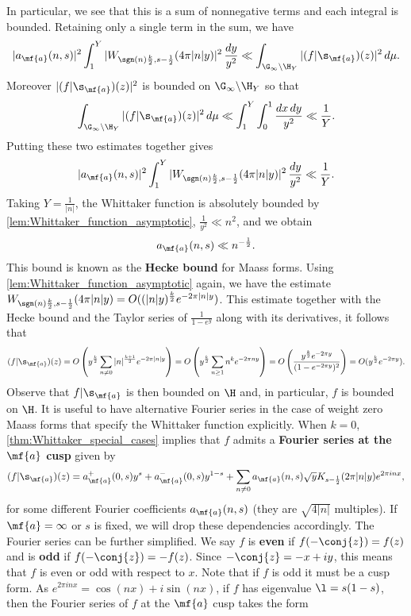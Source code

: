     In particular, we see that this is a sum of nonnegative terms and each integral is bounded. Retaining only a single term in the sum, we have
    \[
      |a_{\mf{a}}(n,s)|^{2}\int_{1}^{Y}|W_{\sgn(n)\frac{k}{2},s-\frac{1}{2}}(4\pi|n|y)|^{2}\,\frac{dy}{y^{2}} \ll \int_{\G_{\infty}\backslash\H_{Y}}|(f|\s_{\mf{a}})(z)|^{2}\,d\mu.
    \]
    Moreover $|(f|\s_{\mf{a}})(z)|^{2}$ is bounded on $\G_{\infty}\backslash\H_{Y}$ so that
    \[
      \int_{\G_{\infty}\backslash\H_{Y}}|(f|\s_{\mf{a}})(z)|^{2}\,d\mu \ll \int_{1}^{Y}\int_{0}^{1}\frac{dx\,dy}{y^{2}} \ll \frac{1}{Y}.
    \]
    Putting these two estimates together gives
    \[
      |a_{\mf{a}}(n,s)|^{2}\int_{1}^{Y}|W_{\sgn(n)\frac{k}{2},s-\frac{1}{2}}(4\pi|n|y)|^{2}\,\frac{dy}{y^{2}} \ll \frac{1}{Y}.
    \]
    Taking $Y = \frac{1}{|n|}$, the Whittaker function is absolutely bounded by \cref{lem:Whittaker_function_asymptotic}, $\frac{1}{y^{2}} \ll n^{2}$, and we obtain
    \[
      a_{\mf{a}}(n,s) \ll n^{-\frac{1}{2}}.
    \]
    This bound is known as the \textbf{Hecke bound} for Maass forms. Using \cref{lem:Whittaker_function_asymptotic} again, we have the estimate $W_{\sgn(n)\frac{k}{2},s-\frac{1}{2}}(4\pi|n|y) = O((|n|y)^{\frac{k}{2}}e^{-2\pi|n|y})$. This estimate together with the Hecke bound and the Taylor series of $\frac{1}{1-e^{y}}$ along with its derivatives, it follows that
    \[
      (f|\s_{\mf{a}})(z) = O\left(y^{\frac{k}{2}}\sum_{n \neq 0}|n|^{\frac{k+1}{2}}e^{-2\pi|n|y}\right) = O\left(y^{\frac{k}{2}}\sum_{n \ge 1}n^{k}e^{-2\pi ny}\right) = O\left(\frac{y^{\frac{k}{2}}e^{-2\pi y}}{(1-e^{-2\pi y})^{2}}\right) = O(y^{\frac{k}{2}}e^{-2\pi y}).
    \]
    Observe that $f|\s_{\mf{a}}$ is then bounded on $\H$ and, in particular, $f$ is bounded on $\H$. It is useful to have alternative Fourier series in the case of weight zero Maass forms that specify the Whittaker function explicitly. When $k = 0$, \cref{thm:Whittaker_special_cases} implies that $f$ admits a \textbf{Fourier series at the $\mf{a}$ cusp} given by
    \[
      (f|\s_{\mf{a}})(z) = a_{\mf{a}}^{+}(0,s)y^{s}+a_{\mf{a}}^{-}(0,s)y^{1-s}+\sum_{n \neq 0}a_{\mf{a}}(n,s)\sqrt{y}K_{s-\frac{1}{2}}(2\pi|n|y)e^{2\pi inx},
    \]
    for some different Fourier coefficients $a_{\mf{a}}(n,s)$ (they are $\sqrt{4|n|}$ multiples). If $\mf{a} = \infty$ or $s$ is fixed, we will drop these dependencies accordingly. The Fourier series can be further simplified. We say $f$ is \textbf{even} if $f(-\conj{z}) = f(z)$ and is \textbf{odd} if $f(-\conj{z}) = -f(z)$. Since $-\conj{z} = -x+iy$, this means that $f$ is even or odd with respect to $x$. Note that if $f$ is odd it must be a cusp form. As $e^{2\pi inx} = \cos(nx)+i\sin(nx)$, if $f$ has eigenvalue $\l = s(1-s)$, then the Fourier series of $f$ at the $\mf{a}$ cusp takes the form
